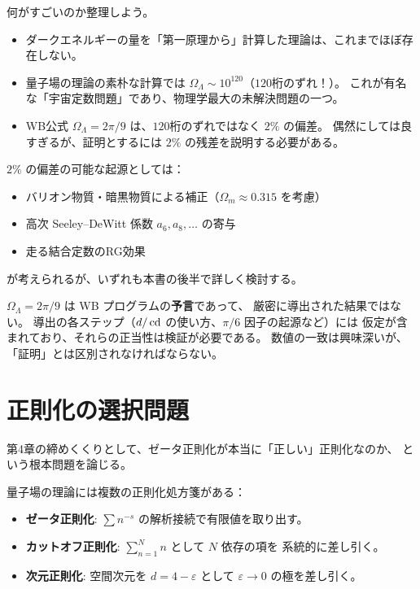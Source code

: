 \begin{hsbox}
何がすごいのか整理しよう。
\begin{itemize}
  \item ダークエネルギーの量を「第一原理から」計算した理論は、これまでほぼ存在しない。
  \item 量子場の理論の素朴な計算では $\Omega_\Lambda \sim 10^{120}$（$120$桁のずれ！）。
        これが有名な「宇宙定数問題」であり、物理学最大の未解決問題の一つ。
  \item WB公式 $\Omega_\Lambda = 2\pi/9$ は、$120$桁のずれではなく $2\%$ の偏差。
        偶然にしては良すぎるが、証明とするには $2\%$ の残差を説明する必要がある。
\end{itemize}
\end{hsbox}

$2\%$ の偏差の可能な起源としては：
\begin{itemize}
  \item バリオン物質・暗黒物質による補正（$\Omega_m \approx 0.315$ を考慮）
  \item 高次 Seeley--DeWitt 係数 $a_6, a_8, \ldots$ の寄与
  \item 走る結合定数のRG効果
\end{itemize}
が考えられるが、いずれも本書の後半で詳しく検討する。

\begin{hypbox}[注意: 仮説の地位]
$\Omega_\Lambda = 2\pi/9$ は WB プログラムの\textbf{予言}であって、
厳密に導出された結果ではない。
導出の各ステップ（$d/\operatorname{cd}$ の使い方、$\pi/6$ 因子の起源など）には
仮定が含まれており、それらの正当性は検証が必要である。
数値の一致は興味深いが、「証明」とは区別されなければならない。
\end{hypbox}

\section{正則化の選択問題}
\label{sec:4.5}

第4章の締めくくりとして、ゼータ正則化が本当に「正しい」正則化なのか、
という根本問題を論じる。

量子場の理論には複数の正則化処方箋がある：
\begin{itemize}
  \item \textbf{ゼータ正則化}: $\sum n^{-s}$ の解析接続で有限値を取り出す。
  \item \textbf{カットオフ正則化}: $\sum_{n=1}^{N} n$ として $N$ 依存の項を
        系統的に差し引く。
  \item \textbf{次元正則化}: 空間次元を $d = 4-\varepsilon$ として
        $\varepsilon\to 0$ の極を差し引く。
\end{itemize}

